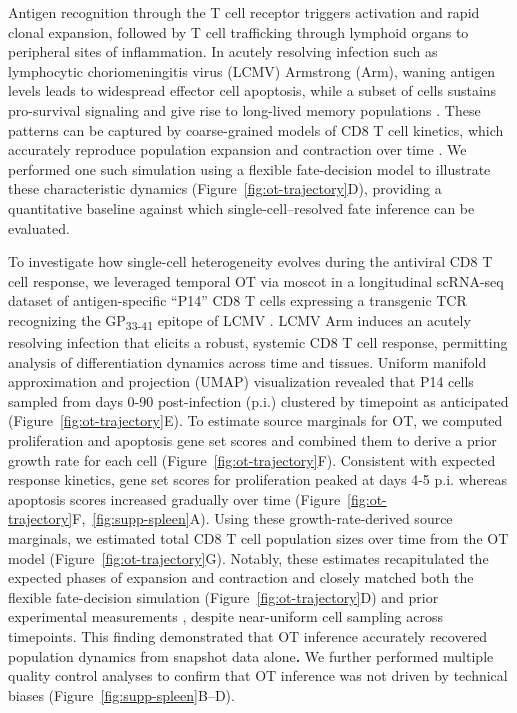 Antigen recognition through the T cell receptor triggers activation and rapid clonal expansion, followed by T cell trafficking through lymphoid organs to peripheral sites of inflammation. In acutely resolving infection such as lymphocytic choriomeningitis virus (LCMV) Armstrong (Arm), waning antigen levels leads to widespread effector cell apoptosis, while a subset of cells sustains pro-survival signaling and give rise to long-lived memory populations \citep{kaechHeterogeneityCellfateDecisions2007}. These patterns can be captured by coarse-grained models of CD8 T cell kinetics, which accurately reproduce population expansion and contraction over time \citep{abadieReversibleTunableEpigenetic2024, althausDynamicsCD8Cell2007, deboerRecruitmentTimesProliferation2001, wuModelingInfluenzaSpecificCD82011}. We performed one such simulation using a flexible fate-decision model to illustrate these characteristic dynamics (Figure~\ref{fig:ot-trajectory}D), providing a quantitative baseline against which single-cell--resolved fate inference can be evaluated.

To investigate how single-cell heterogeneity evolves during the antiviral CD8 T cell response, we leveraged temporal OT via moscot in a longitudinal scRNA-seq dataset of antigen-specific ``P14'' CD8 T cells expressing a transgenic TCR recognizing the GP\textsubscript{33-41} epitope of LCMV \citep{milnerHeterogenousPopulationsTissueResident2020, kurdEarlyPrecursorsMolecular2020}. LCMV Arm induces an acutely resolving infection that elicits a robust, systemic CD8 T cell response, permitting analysis of differentiation dynamics across time and tissues. Uniform manifold approximation and projection (UMAP) visualization \citep{mcinnesUMAPUniformManifold2020a} revealed that P14 cells sampled from days 0-90 post-infection (p.i.) clustered by timepoint as anticipated (Figure~\ref{fig:ot-trajectory}E). To estimate source marginals for OT, we computed proliferation and apoptosis gene set scores and combined them to derive a prior growth rate for each cell (Figure~\ref{fig:ot-trajectory}F). Consistent with expected response kinetics, gene set scores for proliferation peaked at days 4-5 p.i. whereas apoptosis scores increased gradually over time (Figure~\ref{fig:ot-trajectory}F,~\ref{fig:supp-spleen}A). Using these growth-rate-derived source marginals, we estimated total CD8 T cell population sizes over time from the OT model (Figure~\ref{fig:ot-trajectory}G). Notably, these estimates recapitulated the expected phases of expansion and contraction and closely matched both the flexible fate-decision simulation (Figure~\ref{fig:ot-trajectory}D) and prior experimental measurements \citep{deboerRecruitmentTimesProliferation2001, wuModelingInfluenzaSpecificCD82011, wherryViralPersistenceAlters2003}, despite near-uniform cell sampling across timepoints. This finding demonstrated that OT inference accurately recovered population dynamics from snapshot data alone\textbf{.} We further performed multiple quality control analyses to confirm that OT inference was not driven by technical biases (Figure~\ref{fig:supp-spleen}B--D).

